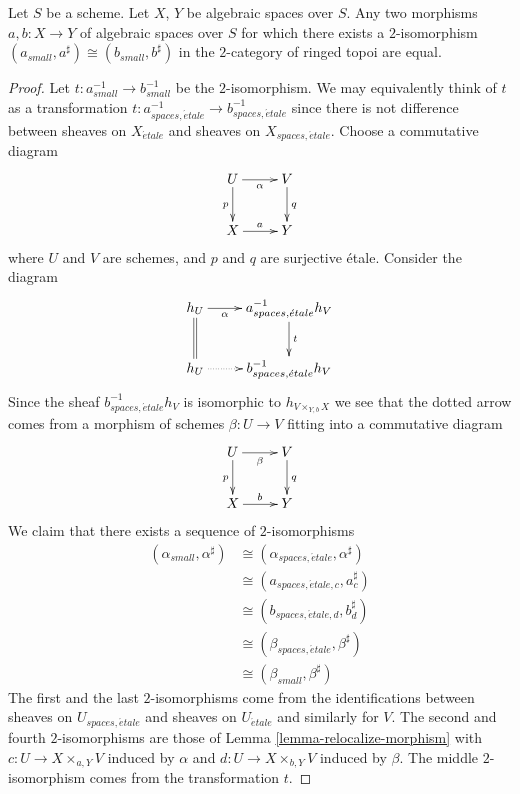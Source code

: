 \begin{lemma}
\label{lemma-faithful}
Let $S$ be a scheme.
Let $X$, $Y$ be algebraic spaces over $S$.
Any two morphisms $a, b : X \to Y$ of algebraic spaces over $S$
for which there exists a $2$-isomorphism
$(a_{small}, a^\sharp) \cong (b_{small}, b^\sharp)$
in the $2$-category of ringed topoi are equal.
\end{lemma}

\begin{proof}
Let $t : a_{small}^{-1} \to b_{small}^{-1}$ be the $2$-isomorphism.
We may equivalently think of $t$ as a transformation
$t : a_{spaces, \acute{e}tale}^{-1} \to b_{spaces, \acute{e}tale}^{-1}$
since there is not difference between sheaves on $X_{\acute{e}tale}$
and sheaves on $X_{spaces, \acute{e}tale}$.
Choose a commutative diagram
$$
\xymatrix{
U \ar[d]_p \ar[r]_\alpha  & V \ar[d]^q \\
X \ar[r]^a & Y
}
$$
where $U$ and $V$ are schemes, and $p$ and $q$ are surjective \'etale.
Consider the diagram
$$
\xymatrix{
h_U \ar[r]_-\alpha \ar@{=}[d] & a_{spaces, \acute{e}tale}^{-1}h_V \ar[d]^t \\
h_U \ar@{..>}[r] & b_{spaces, \acute{e}tale}^{-1}h_V
}
$$
Since the sheaf $b_{spaces, \acute{e}tale}^{-1}h_V$ is isomorphic to
$h_{V \times_{Y, b} X}$ we see that the dotted arrow comes from a
morphism of schemes
$\beta : U \to V$ fitting into a commutative diagram
$$
\xymatrix{
U \ar[d]_p \ar[r]_\beta  & V \ar[d]^q \\
X \ar[r]^b & Y
}
$$
We claim that there exists a sequence of $2$-isomorphisms
\begin{align*}
(\alpha_{small}, \alpha^\sharp)
& \cong
(\alpha_{spaces, \acute{e}tale}, \alpha^\sharp) \\
& \cong
(a_{spaces, \acute{e}tale, c}, a_c^\sharp) \\
& \cong
(b_{spaces, \acute{e}tale, d}, b_d^\sharp) \\
& \cong
(\beta_{spaces, \acute{e}tale}, \beta^\sharp) \\
& \cong
(\beta_{small}, \beta^\sharp)
\end{align*}
The first and the last $2$-isomorphisms come from the identifications
between sheaves on $U_{spaces, \acute{e}tale}$ and sheaves on
$U_{\acute{e}tale}$ and similarly for $V$. The second and fourth
$2$-isomorphisms are those of
Lemma \ref{lemma-relocalize-morphism}
with $c : U \to X \times_{a, Y} V$ induced by $\alpha$ and
$d : U \to X \times_{b, Y} V$ induced by $\beta$.
The middle $2$-isomorphism comes from the transformation $t$.

\end{proof}
